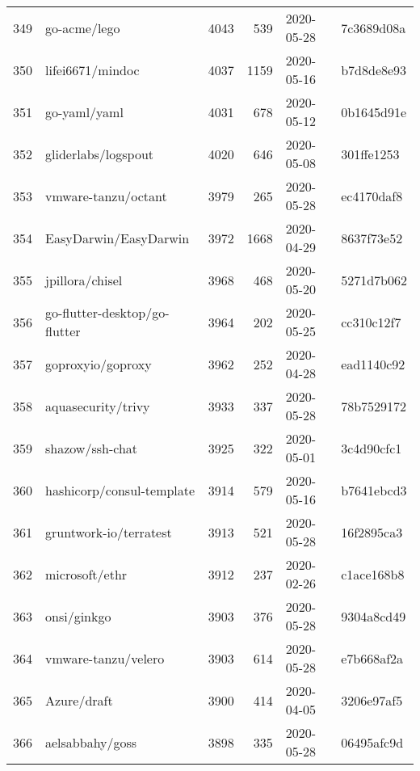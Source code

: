 \begin{longtable}{llrrll}
    349 &                                       go-acme/lego &   4043 &    539 & 2020-05-28 &  7c3689d08a \\
    350 &                                   lifei6671/mindoc &   4037 &   1159 & 2020-05-16 &  b7d8de8e93 \\
    351 &                                       go-yaml/yaml &   4031 &    678 & 2020-05-12 &  0b1645d91e \\
    352 &                                gliderlabs/logspout &   4020 &    646 & 2020-05-08 &  301ffe1253 \\
    353 &                                vmware-tanzu/octant &   3979 &    265 & 2020-05-28 &  ec4170daf8 \\
    354 &                              EasyDarwin/EasyDarwin &   3972 &   1668 & 2020-04-29 &  8637f73e52 \\
    355 &                                    jpillora/chisel &   3968 &    468 & 2020-05-20 &  5271d7b062 \\
    356 &                      go-flutter-desktop/go-flutter &   3964 &    202 & 2020-05-25 &  cc310c12f7 \\
    357 &                                  goproxyio/goproxy &   3962 &    252 & 2020-04-28 &  ead1140c92 \\
    358 &                                 aquasecurity/trivy &   3933 &    337 & 2020-05-28 &  78b7529172 \\
    359 &                                    shazow/ssh-chat &   3925 &    322 & 2020-05-01 &  3c4d90cfc1 \\
    360 &                          hashicorp/consul-template &   3914 &    579 & 2020-05-16 &  b7641ebcd3 \\
    361 &                             gruntwork-io/terratest &   3913 &    521 & 2020-05-28 &  16f2895ca3 \\
    362 &                                     microsoft/ethr &   3912 &    237 & 2020-02-26 &  c1ace168b8 \\
    363 &                                        onsi/ginkgo &   3903 &    376 & 2020-05-28 &  9304a8cd49 \\
    364 &                                vmware-tanzu/velero &   3903 &    614 & 2020-05-28 &  e7b668af2a \\
    365 &                                        Azure/draft &   3900 &    414 & 2020-04-05 &  3206e97af5 \\
    366 &                                    aelsabbahy/goss &   3898 &    335 & 2020-05-28 &  06495afc9d \\

\end{longtable}
